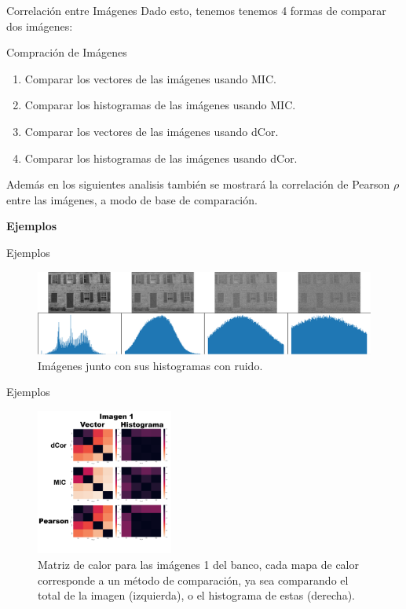 \documentclass{beamer}
\begin{document}
\begin{frame}{Correlaci\'on entre Im\'agenes}
    Dado esto, tenemos tenemos 4 formas de comparar dos imágenes:
    \begin{block}{Compración de Imágenes}
        \begin{enumerate}
            \item Comparar los vectores de las imágenes usando MIC.
            \item Comparar los histogramas de las imágenes usando MIC.
            \item Comparar los vectores de las imágenes usando dCor.
            \item Comparar los histogramas de las imágenes usando dCor.
        \end{enumerate}
       
    \end{block}
    Además en los siguientes analisis también se mostrará la correlación de Pearson $\rho$ entre las imágenes, a modo de base de comparación.
\end{frame}
\begin{frame}
    \begin{center}
        {\LARGE\bf Ejemplos}
    \end{center}
\end{frame}

\begin{frame}{Ejemplos}
    \begin{figure}[H]
        \centering
        \includegraphics[width=\textwidth]{img_hist_noise_one.png}
        \caption{Imágenes junto con sus histogramas con ruido.}
    \end{figure}
\end{frame}
\begin{frame}{Ejemplos}
    \begin{figure}[H]
        \centering
        \includegraphics[width=0.4\textwidth]{heatmap_one.png}
        \caption{Matriz de calor para las im\'agenes 1 del banco, cada mapa de calor corresponde a un m\'etodo de comparaci\'on, ya sea comparando el total de la imagen (izquierda), o el histograma de estas (derecha).}
        \label{fig:heatmapall}
    \end{figure}
\end{frame}
\end{document}
